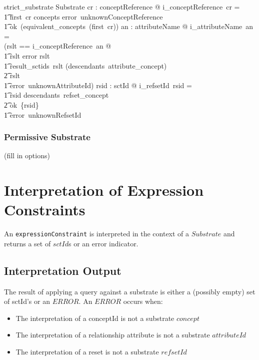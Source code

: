 \documentclass{article}
\def\spec#1{{\tt #1}}
\begin{document}
\begin{schema}{strict\_substrate}
    Substrate
 \where
    \forall cr : conceptReference @ i\_conceptReference~cr = \\
\t1 \IF first~cr \notin concepts \THEN error~unknownConceptReference \\
\t1 \ELSE ok~(equivalent\_concepts~(first~cr))
\also
   \forall an : attributeName @ i\_attributeName~an = \\
   (\LET rslt == i\_conceptReference~an @ \\
\t1 \IF rslt \in \ran error \THEN rslt \\
\t1 \ELSE \IF result\_sctids~rslt \subseteq (descendants~attribute\_concept)  \\
\t2 \THEN rslt \\
\t1 \ELSE error~unknownAttributeId)
\also
  \forall rsid : sctId @ i\_refsetId~rsid = \\
\t1  \IF rsid \in descendants~refset\_concept  \\
\t2 \THEN ok~\{rsid\} \\
\t1 \ELSE error~unknownRefsetId
\end{schema}
     
 
 \subsubsection{Permissive Substrate}
(fill in options)


\section{Interpretation of Expression Constraints}
An \spec{expressionConstraint} is interpreted in the context of a $Substrate$ and returns a set of $sctId$s or an error indicator.  

  
\subsection{Interpretation Output}
The result of applying a query against a substrate is either a (possibly empty) set of sctId's or an $ERROR$.  An $ERROR$ occurs when:
\begin{itemize}[noitemsep,nolistsep]
\item The interpretation of a conceptId is not a substrate $concept$
\item The interpretation of a relationship attribute is not a substrate $attributeId$
\item The interpretation of a reset is not a substrate $refsetId$
\end{itemize}
\end{document}
